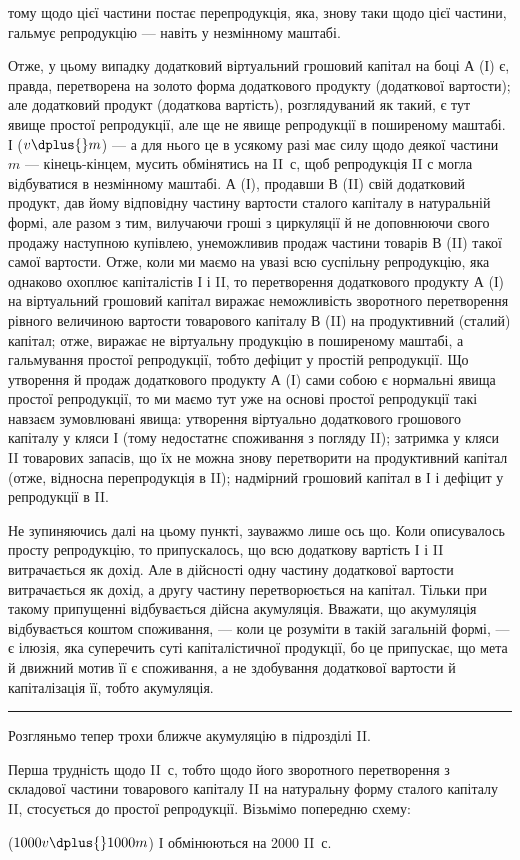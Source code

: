 \parcont{}  %
тому щодо цієї частини постає перепродукція, яка, знову таки щодо цієї
частини, гальмує репродукцію — навіть у незмінному маштабі.

Отже, у цьому випадку додатковий віртуальний грошовий капітал на
боці $А$ (І) є, правда, перетворена на золото форма додаткового продукту
(додаткової вартости); але додатковий продукт (додаткова вартість), розглядуваний
як такий, є тут явище простої репродукції, але ще не явище
репродукції в поширеному маштабі. І ($v \dplus{} m$) — а для нього це в усякому
разі має силу щодо деякої частини $m$ — кінець-кінцем, мусить обмінятись
на II~$с$, щоб репродукція II с могла відбуватися в незмінному маштабі.
$А$ (І), продавши $В$ (II) свій додатковий продукт, дав йому відповідну
частину вартости сталого капіталу в натуральній формі, але разом з тим,
вилучаючи гроші з циркуляції й не доповнюючи свого продажу наступною
купівлею, унеможливив продаж частини товарів $В$ (II) такої самої
вартости. Отже, коли ми маємо на увазі всю суспільну репродукцію, яка
однаково охоплює капіталістів І і II, то перетворення додаткового продукту
$А$ (І) на віртуальний грошовий капітал виражає неможливість зворотного
перетворення рівного величиною вартости товарового капіталу
$В$ (II) на продуктивний (сталий) капітал; отже, виражає не віртуальну
продукцію в поширеному маштабі, а гальмування простої репродукції,
тобто дефіцит у простій репродукції. Що утворення й продаж додаткового
продукту $А$ (І) сами собою є нормальні явища простої репродукції,
то ми маємо тут уже на основі простої репродукції такі навзаєм зумовлювані
явища: утворення віртуально додаткового грошового капіталу у
кляси І (тому недостатнє споживання з погляду II); затримка у кляси II
товарових запасів, що їх не можна знову перетворити на продуктивний
капітал (отже, відносна перепродукція в II); надмірний грошовий капітал
в І і дефіцит у репродукції в II.

Не зупиняючись далі на цьому пункті, зауважмо лише ось що.
Коли описувалось просту репродукцію, то припускалось, що всю додаткову
вартість І і II витрачається як дохід. Але в дійсності одну частину
додаткової вартости витрачається як дохід, а другу частину перетворюється
на капітал. Тільки при такому припущенні відбувається дійсна
акумуляція. Вважати, що акумуляція відбувається коштом споживання, —
коли це розуміти в такій загальній формі, — є ілюзія, яка суперечить суті
капіталістичної продукції, бо це припускає, що мета й движний мотив
її є споживання, а не здобування додаткової вартости й капіталізація її,
тобто акумуляція.

\pfbreak

Розгляньмо тепер трохи ближче акумуляцію в підрозділі II.

Перша трудність щодо II~$с$, тобто щодо його зворотного перетворення
з складової частини товарового капіталу II на натуральну форму
сталого капіталу II, стосується до простої репродукції. Візьмімо попередню
схему:
\begin{center}
  ($1000 v \dplus{} 1000 m$) І обмінюються на
  2000 II~$с$.
\end{center}
